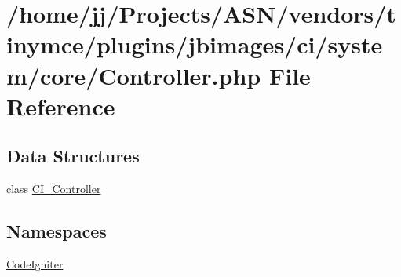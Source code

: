 \hypertarget{_controller_8php}{}\section{/home/jj/\+Projects/\+A\+S\+N/vendors/tinymce/plugins/jbimages/ci/system/core/\+Controller.php File Reference}
\label{_controller_8php}
\subsection*{Data Structures}
\begin{DoxyCompactItemize}
\item 
class \hyperlink{class_c_i___controller}{C\+I\+\_\+\+Controller}
\end{DoxyCompactItemize}
\subsection*{Namespaces}
\begin{DoxyCompactItemize}
\item 
 \hyperlink{namespace_code_igniter}{Code\+Igniter}
\end{DoxyCompactItemize}
